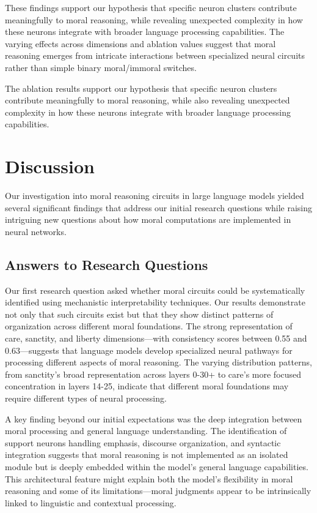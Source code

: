 \documentclass[runninghheads]{llncs}
\begin{document}
These findings support our hypothesis that specific neuron clusters contribute meaningfully to moral reasoning, while revealing unexpected complexity in how these neurons integrate with broader language processing capabilities. The varying effects across dimensions and ablation values suggest that moral reasoning emerges from intricate interactions between specialized neural circuits rather than simple binary moral/immoral switches.

The ablation results support our hypothesis that specific neuron clusters contribute meaningfully to moral reasoning, while also revealing unexpected complexity in how these neurons integrate with broader language processing capabilities.


\section{Discussion}

Our investigation into moral reasoning circuits in large language models yielded several significant findings that address our initial research questions while raising intriguing new questions about how moral computations are implemented in neural networks.

\subsection{Answers to Research Questions}

Our first research question asked whether moral circuits could be systematically identified using mechanistic interpretability techniques. Our results demonstrate not only that such circuits exist but that they show distinct patterns of organization across different moral foundations. The strong representation of care, sanctity, and liberty dimensions—with consistency scores between 0.55 and 0.63—suggests that language models develop specialized neural pathways for processing different aspects of moral reasoning. The varying distribution patterns, from sanctity's broad representation across layers 0-30+ to care's more focused concentration in layers 14-25, indicate that different moral foundations may require different types of neural processing.

A key finding beyond our initial expectations was the deep integration between moral processing and general language understanding. The identification of support neurons handling emphasis, discourse organization, and syntactic integration suggests that moral reasoning is not implemented as an isolated module but is deeply embedded within the model's general language capabilities. This architectural feature might explain both the model's flexibility in moral reasoning and some of its limitations—moral judgments appear to be intrinsically linked to linguistic and contextual processing.
\end{document}
